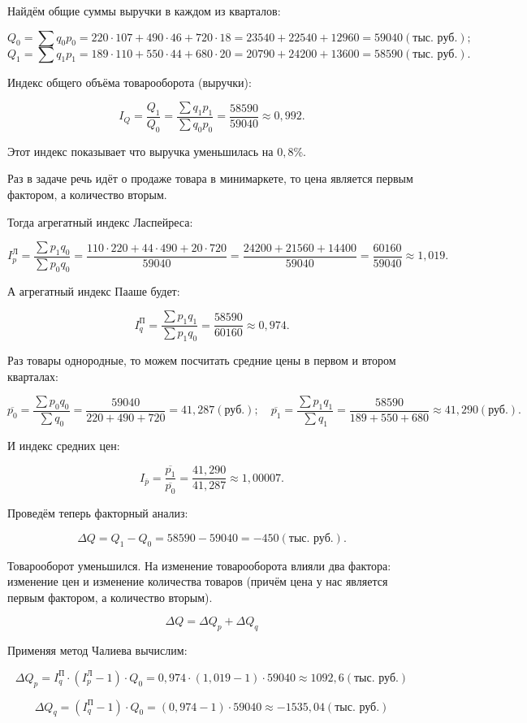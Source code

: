 \documentclass[fleqn]{article}
\begin{document}
Найдём общие суммы выручки в каждом из кварталов:

$$Q_0=\sum{q_0p_0}=220\cdot107+490\cdot46+720\cdot18=23540+22540+12960=59040 (\textit{тыс. руб.});$$
$$Q_1=\sum{q_1p_1}=189\cdot110+550\cdot44+680\cdot20=20790+24200+13600=58590  (\textit{тыс. руб.}).$$

Индекс общего объёма товарооборота (выручки):

$$I_Q=\frac{Q_1}{Q_0}=\frac{\sum{q_1p_1}}{\sum{q_0p_0}}=\frac{58590}{59040}\approx0,992.$$

Этот индекс показывает что выручка уменьшилась на $0,8$\%.

Раз в задаче речь идёт о продаже товара в минимаркете, то цена является первым фактором, а количество вторым.

Тогда агрегатный индекс Ласпейреса:

$$I_p^\textit{Л}=\frac{\sum{p_1q_0}}{\sum{p_0q_0}}=\frac{110\cdot220+44\cdot490+20\cdot720}{59040}=\frac{24200+21560+14400}{59040}=\frac{60160}{59040}\approx1,019.$$

А агрегатный индекс Пааше будет:

$$I_q^\textit{П}=\frac{\sum{p_1q_1}}{\sum{p_1q_0}}=\frac{58590}{60160}\approx0,974.$$

Раз товары однородные, то можем посчитать средние цены в первом и втором кварталах:

$$\overline{p_0}=\frac{\sum{p_0q_0}}{\sum{q_0}}=\frac{59040}{220+490+720}=41,287 (\textit{руб.});\quad\overline{p_1}=\frac{\sum{p_1q_1}}{\sum{q_1}}=\frac{58590}{189+550+680}\approx41,290 (\textit{руб.}).$$

И индекс средних цен:

$$I_{\overline{p}}=\frac{\overline{p_1}}{\overline{p_0}}=\frac{41,290}{41,287}\approx1,00007.$$

Проведём теперь факторный анализ:

$$\Delta Q=Q_1-Q_0=58590-59040=−450 (\textit{тыс. руб.}).$$

Товарооборот уменьшился. На изменение товарооборота влияли два фактора: изменение цен и изменение количества товаров (причём цена у нас является первым фактором, а количество вторым).

$$\Delta Q=\Delta Q_p+\Delta Q_q$$

Применяя метод Чалиева вычислим:

$$\Delta Q_p=I_q^\textit{П}\cdot\left(I_p^\textit{Л}-1\right)\cdot Q_0=0,974\cdot(1,019-1)\cdot59040\approx1092,6 (\textit{тыс. руб.})$$

$$\Delta Q_q=\left(I_q^\textit{П}-1\right)\cdot Q_0=(0,974-1)\cdot59040\approx-1535,04 (\textit{тыс. руб.})$$
\end{document}
